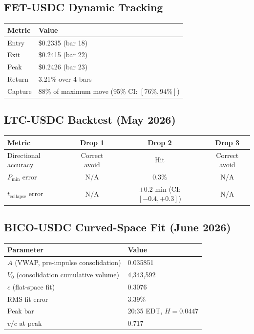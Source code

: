 \documentclass[12pt,a4paper]{article}
\begin{document}
\subsection{FET-USDC Dynamic Tracking}

\begin{center}
\begin{tabular}{ll}
\toprule
Metric & Value \\
\midrule
Entry & \$0.2335 (bar 18) \\
Exit & \$0.2415 (bar 22) \\
Peak & \$0.2426 (bar 23) \\
Return & 3.21\% over 4 bars \\
Capture & 88\% of maximum move (95\% CI: $[76\%,94\%]$) \\
\bottomrule
\end{tabular}
\end{center}

\subsection{LTC-USDC Backtest (May 2026)}

\begin{center}
\begin{tabular}{lccc}
\toprule
Metric & Drop 1 & Drop 2 & Drop 3 \\
\midrule
Directional accuracy & Correct avoid & Hit & Correct avoid \\
$P_\text{min}$ error & N/A & 0.3\% & N/A \\
$t_\text{collapse}$ error & N/A & $\pm0.2$ min (CI: $[-0.4,+0.3]$) & N/A \\
\bottomrule
\end{tabular}
\end{center}

\subsection{BICO-USDC Curved-Space Fit (June 2026)}

\begin{center}
\begin{tabular}{ll}
\toprule
Parameter & Value \\
\midrule
$A$ (VWAP, pre-impulse consolidation) & 0.035851 \\
$V_0$ (consolidation cumulative volume) & 4{,}343{,}592 \\
$c$ (flat-space fit) & 0.3076 \\
RMS fit error & 3.39\% \\
Peak bar & 20:35 EDT, $H=0.0447$ \\
$v/c$ at peak & 0.717 \\
\bottomrule
\end{tabular}
\end{center}
\end{document}
